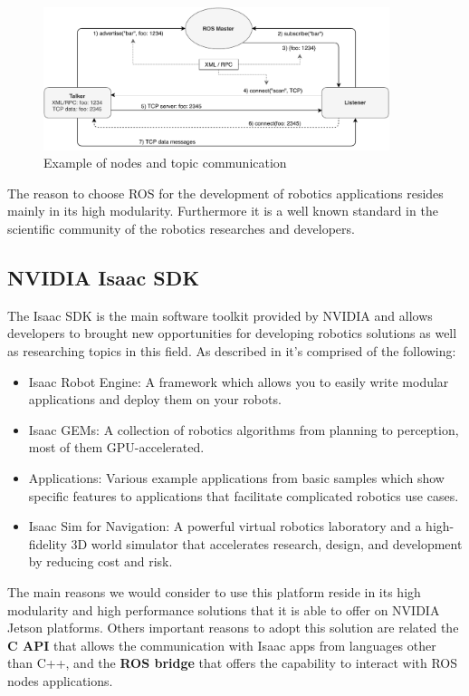 \begin{figure}[tbp]
	\centering
	\includegraphics[width=0.9\textwidth]{images/ROSexample2.pdf}
	\caption{Example of nodes and topic communication}
	\label{fig:ros-nodes-topics}
\end{figure}

The reason to choose ROS for the development of robotics applications resides mainly in its high modularity. Furthermore it is a well known standard in the scientific community of the robotics researches and developers.




\subsection{NVIDIA Isaac SDK}
The Isaac SDK is the main software toolkit provided by NVIDIA and allows developers to brought new opportunities for developing robotics solutions as well as researching topics in this field. As described in \cite{ISAAC} it's comprised of the following:
\begin{itemize}
	\item Isaac Robot Engine: A framework which allows you to easily write modular applications and deploy them on your robots.
	\item Isaac GEMs: A collection of robotics algorithms from planning to perception, most of them GPU-accelerated.
	\item Applications: Various example applications from basic samples which show specific features to applications that facilitate complicated robotics use cases.
	\item Isaac Sim for Navigation: A powerful virtual robotics laboratory and a high-fidelity 3D world simulator that accelerates research, design, and development by reducing cost and risk.
\end{itemize}

The main reasons we would consider to use this platform reside in its high modularity and high performance solutions that it is able to offer on NVIDIA Jetson platforms.
Others important reasons to adopt this solution are related the \textbf{C API} that allows the communication with Isaac apps from languages other than C++, and the \textbf{ROS bridge} that offers the capability to interact with ROS nodes applications.

